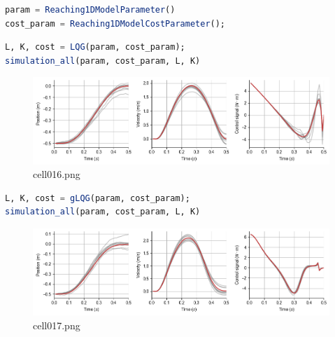 \begin{lstlisting}[language=julia]
param = Reaching1DModelParameter()
cost_param = Reaching1DModelCostParameter();
\end{lstlisting}
\begin{lstlisting}[language=julia]
L, K, cost = LQG(param, cost_param);
simulation_all(param, cost_param, L, K)
\end{lstlisting}
\begin{figure}[ht]
	\centering
	\includegraphics[scale=0.8, max width=\linewidth]{./fig/motor-learning/optimal-feedback-control/cell016.png}
	\caption{cell016.png}
	\label{cell016.png}
\end{figure}
\begin{lstlisting}[language=julia]
L, K, cost = gLQG(param, cost_param);
simulation_all(param, cost_param, L, K)
\end{lstlisting}
\begin{figure}[ht]
	\centering
	\includegraphics[scale=0.8, max width=\linewidth]{./fig/motor-learning/optimal-feedback-control/cell017.png}
	\caption{cell017.png}
	\label{cell017.png}
\end{figure}
